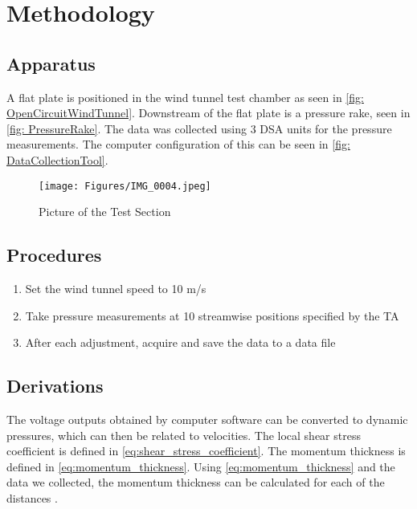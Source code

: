 \chapter{Methodology}
\label{cp:methodology}
\section{Apparatus}
A flat plate is positioned in the wind tunnel test chamber as seen in \autoref{fig: OpenCircuitWindTunnel}. Downstream of the flat plate is a pressure rake, seen in \autoref{fig: PressureRake}. The data was collected using 3 DSA units for the pressure measurements. The computer configuration of this can be seen in \autoref{fig: DataCollectionTool}.

\begin{figure}[htpb]
    \centering
    \texttt{[image: Figures/IMG\_0004.jpeg]}
    \caption[Picture of the test section]{Picture of the Test Section}
    \label{fig: OpenCircuitWindTunnel}
\end{figure}


\section{Procedures}
\begin{enumerate}
\item Set the wind tunnel speed to 10 m/s
\item Take pressure measurements at 10 streamwise positions specified by the TA %
\item After each adjustment, acquire and save the data to a data file
\end{enumerate}

\section{Derivations}

The voltage outputs obtained by computer software can be converted to dynamic pressures, which can then be related to velocities. The local shear stress coefficient is defined in \autoref{eq:shear_stress_coefficient}. The momentum thickness is defined in \autoref{eq:momentum_thickness}. Using \autoref{eq:momentum_thickness} and the data we collected, the momentum thickness can be calculated for each of the distances \citep{lab8-manual}.


